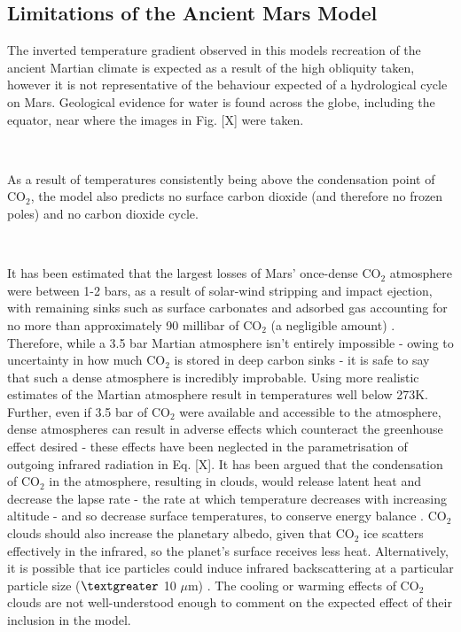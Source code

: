 \documentclass[12pt,onecolumn]{revtex4-2}    %
\begin{document}
\subsection{Limitations of the Ancient Mars Model}

The inverted temperature gradient observed in this models recreation of the ancient Martian climate is expected as a result of the high obliquity taken, however it is not representative of the behaviour expected of a hydrological cycle on Mars. Geological evidence for water is found across the globe, including the equator, near where the images in Fig. [X] were taken. 

\

As a result of temperatures consistently being above the condensation point of $\mathrm{CO_2}$, the model also predicts no surface carbon dioxide (and therefore no frozen poles) and no carbon dioxide cycle. 

\

It has been estimated that the largest losses of Mars' once-dense $\mathrm{CO_2}$ atmosphere were between 1-2 bars, as a result of solar-wind stripping and impact ejection, with remaining sinks such as surface carbonates and adsorbed gas accounting for no more than approximately 90 millibar of $\mathrm{CO_2}$ (a negligible amount) \cite{J19}. Therefore, while a 3.5 bar Martian atmosphere isn't entirely impossible - owing to uncertainty in how much $\mathrm{CO_2}$ is stored in deep carbon sinks - it is safe to say that such a dense atmosphere is incredibly improbable. Using more realistic estimates of the Martian atmosphere result in temperatures well below 273K. Further, even if 3.5 bar of $\mathrm{CO_2}$ were available and accessible to the atmosphere, dense atmospheres can result in adverse effects which counteract the greenhouse effect desired - these effects have been neglected in the parametrisation of outgoing infrared radiation in Eq. [X]. It has been argued that the condensation of $\mathrm{CO_2}$ in the atmosphere, resulting in clouds, would release latent heat and decrease the lapse rate - the rate at which temperature decreases with increasing altitude - and so decrease surface temperatures, to conserve energy balance \cite{K91}. $\mathrm{CO_2}$ clouds should also increase the planetary albedo, given that $\mathrm{CO_2}$ ice scatters effectively in the infrared, so the planet's surface receives less heat. Alternatively, it is possible that ice particles could induce infrared backscattering at a particular particle size ($\textgreater$ 10 $\mu$m) \cite{FP97}. The cooling or warming effects of $\mathrm{CO_2}$ clouds are not well-understood enough to comment on the expected effect of their inclusion in the model.
\end{document}
